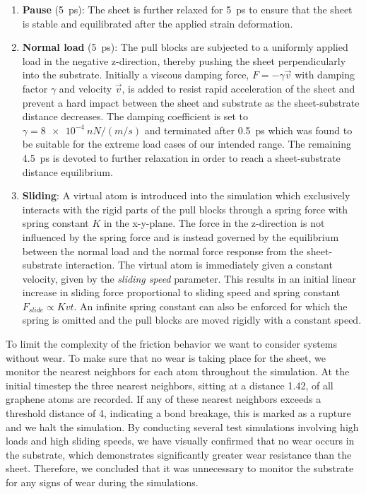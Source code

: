 \begin{enumerate}
  \item \textbf{Pause} (\SI{5}{ps}): The sheet is further relaxed for \SI{5}{ps} to ensure that the sheet is stable and equilibrated after the applied strain deformation. 
  \item \textbf{Normal load} (\SI{5}{ps}): The pull blocks are subjected to a uniformly applied load in the negative z-direction, thereby pushing the sheet perpendicularly into the substrate. Initially a viscous damping force, $F = -\gamma \vec{v}$ with damping factor $\gamma$ and velocity $\vec{v}$, is added to resist rapid acceleration of the sheet and prevent a hard impact between the sheet and substrate as the sheet-substrate distance decreases. The damping coefficient is set to $\gamma = \SI{8e-4}{nN/(m/s)}$ and terminated after \SI{0.5}{ps} which was found to be suitable for the extreme load cases of our intended range. The remaining \SI{4.5}{ps} is devoted to further relaxation in order to reach a sheet-substrate distance equilibrium.
  \item \textbf{Sliding}: A virtual atom is introduced into the simulation which
  exclusively interacts with the rigid parts of the pull blocks through a spring force with spring constant $K$ in the x-y-plane. The force in the z-direction is not influenced by the spring force and is instead governed by the equilibrium between the normal load and the normal force response from the sheet-substrate interaction. The virtual atom is immediately given a constant velocity, given by the \textit{sliding speed} parameter. This results in an initial linear increase in sliding force proportional to sliding speed and spring constant $F_{\textit{slide}} \propto Kvt$. An infinite spring constant can also be enforced for which the spring is omitted and the pull blocks are moved rigidly with a constant speed.
\end{enumerate}
To limit the complexity of the friction behavior we want to consider systems without wear. To make sure that no wear is taking place for the sheet, we monitor the nearest neighbors for each atom throughout the simulation. At the initial timestep the three nearest neighbors, sitting at a distance \SI{1.42}{}, of all graphene atoms are recorded. If any of these nearest neighbors exceeds a threshold distance of \SI{4}{}, indicating a bond breakage, this is marked as a rupture and we halt the simulation. By conducting several test simulations involving high loads and high sliding speeds, we have visually confirmed that no wear occurs in the substrate, which demonstrates significantly greater wear resistance than the sheet. Therefore, we concluded that it was unnecessary to monitor the substrate for any signs of wear during the simulations.



